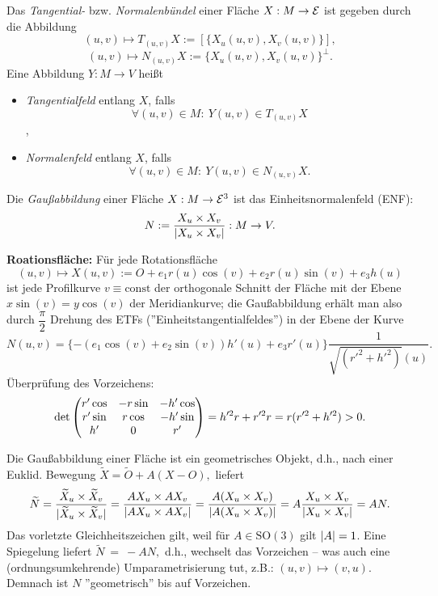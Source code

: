\begin{definition}
	
	Das \emph{Tangential-} bzw. \emph{Normalenbündel} einer Fläche $ X: M \rightarrow \mathcal E $ ist gegeben durch die Abbildung 
		\[ (u,v) \mapsto T_{(u,v)}X := [ \{X_u(u,v),X_v(u,v)\} ], \]
		\[ (u,v) \mapsto N_{(u,v)}X := \{ X_u(u,v),X_v(u,v) \}^{\perp}. \]
	Eine Abbildung $ Y : M \rightarrow V $ heißt 
	
	\begin{itemize}
		
		\item \emph{Tangentialfeld} entlang $ X $, falls 
			\[ \forall (u,v) \in M: ~ Y(u,v) \in T_{(u,v)}X \],
			
		\item \emph{Normalenfeld} entlang $ X $, falls
			\[ \forall(u,v) \in M: ~ Y(u,v) \in N_{(u,v)}X. \]
		
	\end{itemize}

	Die \emph{Gaußabbildung} einer Fläche $ X: M \rightarrow \mathcal E^3 $ ist das Einheitsnormalenfeld (ENF):
		\[ N:= \dfrac{X_u \times X_v}{\left| X_u \times X_v\right|}: M \rightarrow V. \]
	
\end{definition}
	
\begin{example}
	\textbf{Roationsfläche:}
	Für jede Rotationsfläche
		\[ (u,v) \mapsto X(u,v) := O + e_1r(u)\cos(v) + e_2 r(u) \sin(v) + e_3h(u) \]
	ist jede Profilkurve $ v \equiv \mathrm{const} $ der orthogonale Schnitt der Fläche mit der Ebene $ x\sin(v) = y \cos(v) $ der Meridiankurve; die Gaußabbildung erhält man also durch $ \dfrac{\pi}{2} $ Drehung des ETFs (''Einheitstangentialfeldes'') in der Ebene der Kurve 
		\[ N(u,v) = \{ -(e_1\cos(v) + e_2\sin(v))h'(u)+e_3r'(u) \} \dfrac{1}{\sqrt{(r'^2 + h'^2)}(u)}. \]
	Überprüfung des Vorzeichens:
	\[ \det \begin{pmatrix} r'\cos & -r\sin & -h'\cos \\ r'\sin & r\cos & -h'\sin \\ h' & 0 & r' \end{pmatrix} = h'^2r + r'^2r = r(r'^2 + h'^2) > 0. \]
	
\end{example}
	
\begin{remark}
	
	Die Gaußabbildung einer Fläche ist ein geometrisches Objekt, d.h.,
	nach einer Euklid. Bewegung $ \widetilde{X} = \widetilde{O} + A(X-O), $ liefert
		\[ \widetilde{N}=\dfrac{\widetilde{X}_u \times \widetilde{X}_v}{|\widetilde{X}_u \times \widetilde{X}_v|} = \dfrac{AX_u \times A X_v}{\left| AX_u \times AX_v\right|} = \dfrac{A(X_u \times X_v)}{\left| A(X_u \times X_v)\right|} = A \dfrac{X_u \times  X_v}{\left| X_u \times X_v\right|} = AN. \]
	Das vorletzte Gleichheitszeichen gilt, weil für $A \in \mathrm{SO}(3)$ gilt $ \left| A\right|=1 $. 
	Eine Spiegelung liefert $ \widetilde{N}~=~-AN, $ d.h., wechselt das Vorzeichen -- was auch eine (ordnungsumkehrende) Umparametrisierung tut, z.B.: $ (u,v) \mapsto(v,u) $.
	Demnach ist $ N $ ''geometrisch'' bis auf Vorzeichen.
	
\end{remark}


